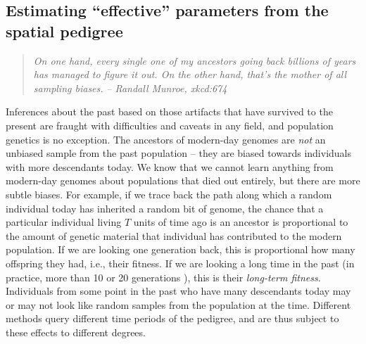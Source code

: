 \documentclass{ar-1col}
\renewcommand{\emph}[1]{{\textit{#1}}}
\begin{document}
\subsection{Estimating ``effective'' parameters from the spatial pedigree}

\begin{quote}
    \textit{
    On one hand, every single one of my ancestors going back billions of years
    has managed to figure it out.
    On the other hand, that's the mother of all sampling biases.}
    \hfill \textit{-- Randall Munroe, xkcd:674}
\end{quote}

Inferences about the past
based on those artifacts that have survived to the present
are fraught with difficulties and caveats in any field, 
and population genetics is no exception.
The ancestors of modern-day genomes are \emph{not} an unbiased sample
from the past population -- 
they are biased towards individuals with more descendants today.
We know that we cannot learn anything from modern-day genomes
about populations that died out entirely, 
but there are more subtle biases.
For example, if we trace back the path along which a random individual today 
has inherited a random bit of genome,
the chance that a particular individual living $T$ units of time ago is an ancestor
is proportional to the amount of genetic material that individual has contributed to the modern population.
If we are looking one generation back, 
this is proportional how many offspring they had, i.e., their fitness.
If we are looking a long time in the past
(in practice, more than 10 or 20 generations \citep{BartonEtheridge2011fitness}),
this is their \emph{long-term fitness}.
Individuals from some point in the past who have many descendants today
may or may not look like random samples from the population at the time.
Different methods query different time periods of the pedigree,
and are thus subject to these effects to different degrees.
\end{document}
